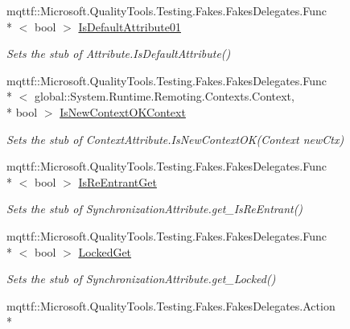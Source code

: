 \begin{DoxyCompactItemize}
mqttf\-::\-Microsoft.\-Quality\-Tools.\-Testing.\-Fakes.\-Fakes\-Delegates.\-Func\\*
$<$ bool $>$ \hyperlink{class_system_1_1_runtime_1_1_remoting_1_1_contexts_1_1_fakes_1_1_stub_synchronization_attribute_a6625ac51a6c15ec7ec9d458878ef24b5}{Is\-Default\-Attribute01}
\begin{DoxyCompactList}\small\item\em Sets the stub of Attribute.\-Is\-Default\-Attribute()\end{DoxyCompactList}\item 
mqttf\-::\-Microsoft.\-Quality\-Tools.\-Testing.\-Fakes.\-Fakes\-Delegates.\-Func\\*
$<$ global\-::\-System.\-Runtime.\-Remoting.\-Contexts.\-Context, \\*
bool $>$ \hyperlink{class_system_1_1_runtime_1_1_remoting_1_1_contexts_1_1_fakes_1_1_stub_synchronization_attribute_a9b38c9f651b509d52760506f89a68206}{Is\-New\-Context\-O\-K\-Context}
\begin{DoxyCompactList}\small\item\em Sets the stub of Context\-Attribute.\-Is\-New\-Context\-O\-K(\-Context new\-Ctx)\end{DoxyCompactList}\item 
mqttf\-::\-Microsoft.\-Quality\-Tools.\-Testing.\-Fakes.\-Fakes\-Delegates.\-Func\\*
$<$ bool $>$ \hyperlink{class_system_1_1_runtime_1_1_remoting_1_1_contexts_1_1_fakes_1_1_stub_synchronization_attribute_a4ca0e4320272cdcfcd3281ac0521b6be}{Is\-Re\-Entrant\-Get}
\begin{DoxyCompactList}\small\item\em Sets the stub of Synchronization\-Attribute.\-get\-\_\-\-Is\-Re\-Entrant()\end{DoxyCompactList}\item 
mqttf\-::\-Microsoft.\-Quality\-Tools.\-Testing.\-Fakes.\-Fakes\-Delegates.\-Func\\*
$<$ bool $>$ \hyperlink{class_system_1_1_runtime_1_1_remoting_1_1_contexts_1_1_fakes_1_1_stub_synchronization_attribute_abd915578947cdb85311c8215680a7ffb}{Locked\-Get}
\begin{DoxyCompactList}\small\item\em Sets the stub of Synchronization\-Attribute.\-get\-\_\-\-Locked()\end{DoxyCompactList}\item 
mqttf\-::\-Microsoft.\-Quality\-Tools.\-Testing.\-Fakes.\-Fakes\-Delegates.\-Action\\*

\end{DoxyCompactItemize}

